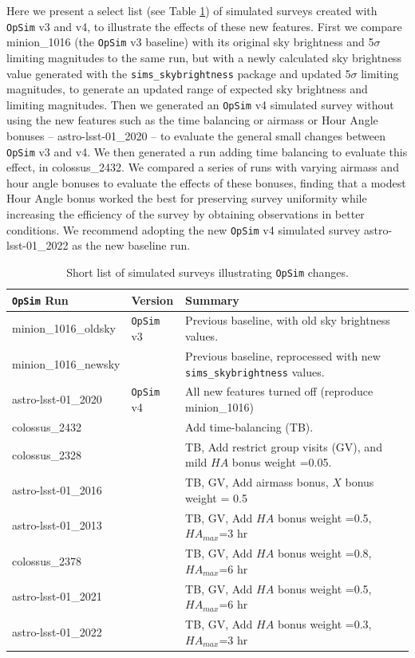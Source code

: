 \documentclass[DM,lsstdraft,authoryear,toc]{lsstdoc}
\newcommand{\opsim}{\texttt{OpSim}\xspace}
\newcommand{\simsky}{\texttt{sims\_skybrightness}\xspace}
\begin{document}
Here we present a select list (see Table \ref{tab:runlist}) of simulated surveys created with \opsim v3 and v4, to illustrate the effects of these new features. First we compare minion\_1016 (the \opsim v3 baseline) with its original sky brightness and 5$\sigma$ limiting magnitudes to the same run, but with a newly calculated sky brightness value generated with the \simsky package and updated 5$\sigma$ limiting magnitudes, to generate an updated range of expected sky brightness and limiting magnitudes. Then we generated an \opsim v4 simulated survey without using the new features such as the time balancing or airmass or Hour Angle bonuses -- astro-lsst-01\_2020 -- to evaluate the general small changes between \opsim v3 and v4. We then generated a run adding time balancing to evaluate this effect, in colossus\_2432.  We compared a series of runs with varying airmass and hour angle bonuses to evaluate the effects of these bonuses, finding that a modest Hour Angle bonus worked the best for preserving survey uniformity while increasing the efficiency of the survey by obtaining observations in better conditions. We recommend adopting the new \opsim v4 simulated survey astro-lsst-01\_2022 as the new baseline run.

\begin{table}[htp]
\caption{Short list of simulated surveys illustrating \opsim changes.}
\begin{center}
\begin{tabular}{ l | l | l }
\toprule
\opsim Run & Version & Summary \\
\midrule
minion\_1016\_oldsky & \opsim v3 & Previous baseline, with old sky brightness values. \\
minion\_1016\_newsky &  & Previous baseline, reprocessed with new \simsky values.\\
astro-lsst-01\_2020 & \opsim v4  & All new features turned off (reproduce minion\_1016) \\
colossus\_2432 &  & Add time-balancing (TB).\\
colossus\_2328 &  & TB, Add restrict group visits (GV), and mild $HA$ bonus weight =0.05. \\
astro-lsst-01\_2016 &  & TB, GV, Add airmass bonus, $X$ bonus weight = 0.5 \\
astro-lsst-01\_2013 &  & TB, GV, Add $HA$ bonus weight =0.5, $HA_{max}$=3 hr\\
colossus\_2378 &  &  TB, GV, Add $HA$ bonus weight =0.8, $HA_{max}$=6 hr\\
astro-lsst-01\_2021 & & TB, GV, Add $HA$ bonus weight =0.5, $HA_{max}$=6  hr\\
astro-lsst-01\_2022 &   & TB, GV, Add $HA$ bonus weight =0.3, $HA_{max}$=3 hr\\
\bottomrule
\end{tabular}
\end{center}
\label{tab:runlist}
\end{table}
\end{document}
